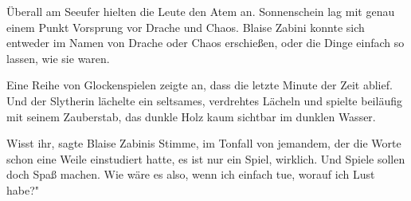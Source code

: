 Überall am Seeufer hielten die Leute den Atem an. Sonnenschein lag mit genau
einem Punkt Vorsprung vor Drache und Chaos. Blaise Zabini konnte sich entweder
im Namen von Drache oder Chaos erschießen, oder die Dinge einfach so lassen, wie
sie waren.

Eine Reihe von Glockenspielen zeigte an, dass die letzte Minute der Zeit ablief.
Und der Slytherin lächelte ein seltsames, verdrehtes Lächeln und spielte
beiläufig mit seinem Zauberstab, das dunkle Holz kaum sichtbar im dunklen
Wasser.

\glqq Wisst ihr\grqq{}, sagte Blaise Zabinis Stimme, im Tonfall von jemandem,
der die Worte schon eine Weile einstudiert hatte, \glqq es ist nur ein Spiel,
wirklich. Und Spiele sollen doch Spaß machen. Wie wäre es also, wenn ich einfach
tue, worauf ich Lust habe?"

